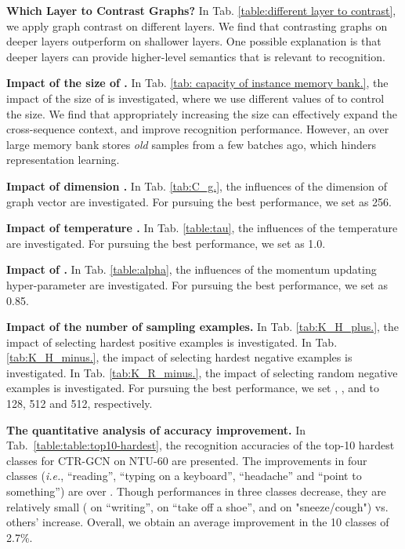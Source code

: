 \documentclass{article} \usepackage{iclr2023_conference,times}
\begin{document}
\noindent \textbf{Which Layer to Contrast Graphs?} In Tab. \ref{table:different layer to contrast}, we apply graph contrast on different layers. We find that contrasting graphs on deeper layers outperform on shallower layers. One possible explanation is that deeper layers can provide higher-level semantics that is relevant to recognition.

\textbf{Impact of the size of .} In Tab. \ref{tab: capacity of instance memory bank.}, the impact of the size of  is investigated, where we use different values of  to control the size. We find that appropriately increasing the size can effectively expand the cross-sequence context, and improve recognition performance. However, an over large memory bank stores \textit{old} samples from a few batches ago, which hinders representation learning.

\noindent \textbf{Impact of dimension .} 
In Tab. \ref{tab:C_g.}, the influences of the dimension of graph vector  are investigated. For pursuing the best performance, we set  as 256.

\noindent \textbf{Impact of temperature .} 
In Tab. \ref{table:tau}, the influences of the temperature  are investigated. For pursuing the best performance, we set  as 1.0.

\noindent \textbf{Impact of .} 
In Tab. \ref{table:alpha}, the influences of the momentum updating hyper-parameter  are investigated. For pursuing the best performance, we set  as 0.85.

\textbf{Impact of the number of sampling examples.}
In Tab. \ref{tab:K_H_plus.}, the impact of selecting  hardest positive examples is investigated. 
In Tab. \ref{tab:K_H_minus.}, the impact of selecting  hardest negative examples is investigated. 
In Tab. \ref{tab:K_R_minus.}, the impact of selecting  random negative examples is investigated. 
For pursuing the best performance, we set , , and  to 128, 512 and 512, respectively.








\textbf{The quantitative analysis of accuracy improvement.}
In Tab.~\ref{table:table:top10-hardest}, the recognition accuracies of the top-10 hardest classes for CTR-GCN on NTU-60 are presented. The improvements in four classes (\emph{i.e.}, ``reading'', ``typing on a keyboard'', ``headache'' and ``point to something'') are over . Though performances in three classes decrease, they are relatively small ( on ``writing'',  on ``take off a shoe'', and  on "sneeze/cough") vs. others' increase. Overall, we obtain an average improvement in the 10 classes of 2.7\%.
\end{document}
